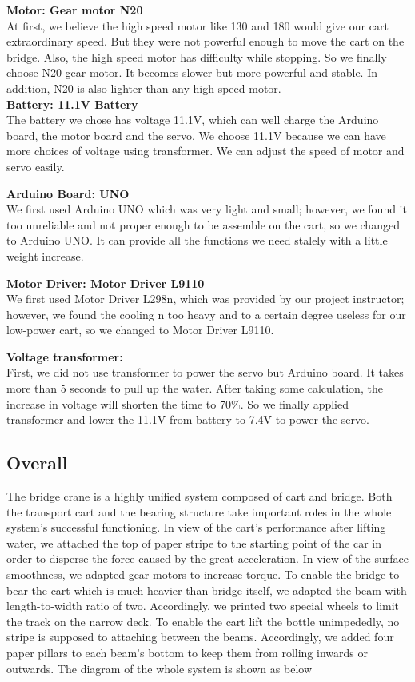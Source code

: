 \medskip
\noindent
\textbf{Motor: Gear motor N20 } \\
\indent
At first, we believe the high speed motor like 130 and 180 would give our cart
extraordinary speed.
But they were not powerful enough to move the cart on the bridge.
Also, the high speed motor has difficulty while stopping.
So we finally choose N20 gear motor.
It becomes slower but more powerful and stable.
In addition, N20 is also lighter than any high speed motor.  \\

\medskip
\noindent
\textbf{Battery: 11.1V Battery } \\
\indent
The battery we chose has voltage 11.1V, which can well charge the Arduino board,
the motor board and the servo.
We choose 11.1V because we can have more choices of voltage using transformer.
We can adjust the speed of motor and servo easily.  

\medskip
\noindent
\textbf{Arduino Board: UNO } \\
\indent
We first used Arduino UNO which was very light and small; however, we found it
too unreliable and not proper enough to be assemble on the cart, so we changed
to Arduino UNO.
It can provide all the functions we need stalely with a little weight increase.

\medskip
\noindent
\textbf{Motor Driver: Motor Driver L9110 } \\
\indent
We first used Motor Driver L298n, which was provided by our project instructor;
however, we found the cooling n too heavy and to a certain degree useless for
our low-power cart, so we changed to Motor Driver L9110.

\medskip
\noindent
\textbf{Voltage transformer:} \\
\indent
First, we did not use transformer to power the servo but Arduino board.
It takes more than 5 seconds to pull up the water.
After taking some calculation, the increase in voltage will shorten the time to
70\%.
So we finally applied transformer and lower the 11.1V from battery to 7.4V to
power the servo.

\subsection{Overall}

The bridge crane is a highly unified system composed of cart and bridge. Both the transport cart and the bearing structure take important roles in the whole system’s successful functioning.
In view of the cart’s performance after lifting water, we attached the top of paper stripe to the starting point of the car in order to disperse the force caused by the great acceleration. In view of the surface smoothness, we adapted gear motors to increase torque.
To enable the bridge to bear the cart which is much heavier than bridge itself, we adapted the beam with length-to-width ratio of two. Accordingly, we printed two special wheels to limit the track on the narrow deck. To enable the cart lift the bottle unimpededly, no stripe is supposed to attaching between the beams. Accordingly, we added four paper pillars to each beam’s bottom to keep them from rolling inwards or outwards. 
The diagram of the whole system is shown as below

